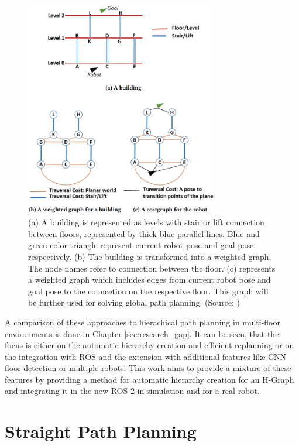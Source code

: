 \begin{figure}[h]
    \centering
    \includegraphics[width=0.75\textwidth]{figures/20_state_of_the_art/dihman_cost_graph.png}
    \caption[The costgraph for the robot]{(a) A building is represented as levels with stair or lift connection between floors, represented by thick blue parallel-lines. Blue and green color triangle represent current robot pose and goal pose respectively. (b) The building is transformed into a weighted graph. The node names refer to connection between the floor. (c) represents a weighted graph which includes edges from current robot pose and goal pose to the conncetion on the respective floor. This graph will be further used for solving global path planning. (Source: \cite{dhiman_ros_2020})}
    \label{fig:dihman_cost_graph}
\end{figure}

A comparison of these approaches to hierachical path planning in multi-floor environments is done in Chapter \ref{sec:research_gap}.
It can be seen, that the focus is either on the automatic hierarchy creation and efficient replanning or on the integration with ROS and the extension with additional features like CNN floor detection or multiple robots. This work aims to provide a mixture of these features by providing a method for automatic hierarchy creation for an H-Graph and integrating it in the new ROS 2 in simulation and for a real robot.

\section{Straight Path Planning}
\label{sec:straight_paths}

